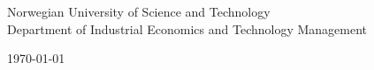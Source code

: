 \begin{titlepage}
	\vfill

	\begin{center}
		{\color{ntnu-blue}\sffamily\Large Norwegian University of Science and Technology}\\
		\vspace{0.3cm}
		{\sffamily\large Department of Industrial Economics and Technology Management}

		\vspace{0.5cm}
		{\large\today}
	\end{center}

	\vspace{1cm}
\end{titlepage}

